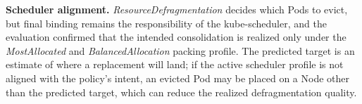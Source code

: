 \textbf{Scheduler alignment.} \textit{ResourceDefragmentation} decides which Pods to evict, but final binding remains the responsibility of the kube-scheduler, and the evaluation confirmed that the intended consolidation is realized only under the \textit{MostAllocated} and \textit{BalancedAllocation} packing profile. The predicted target is an estimate of where a replacement will land; if the active scheduler profile is not aligned with the policy's intent, an evicted Pod may be placed on a Node other than the predicted target, which can reduce the realized defragmentation quality.
